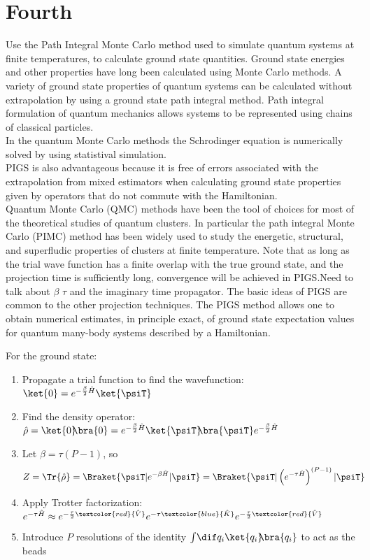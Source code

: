 \section{Fourth}
 Use the Path Integral Monte Carlo method used to simulate quantum systems at finite temperatures, to calculate ground state quantities. Ground state energies and other properties have long been calculated using Monte Carlo methods. A variety of ground state properties of quantum systems can be calculated without extrapolation by using a ground state path integral method. Path integral formulation of quantum mechanics allows systems to be represented using chains of classical particles. \\
In the quantum Monte Carlo methods the Schrodinger equation is numerically solved by using statistival simulation. \\
PIGS is also advantageous because it is free of errors associated with the extrapolation from mixed estimators when calculating ground state properties given by operators that do not commute with the Hamiltonian. \\
Quantum Monte Carlo (QMC) methods have been the tool of choices for most of the theoretical studies of quantum clusters. In particular the path integral Monte Carlo (PIMC) method has been widely used to study the energetic, structural, and superfludic properties of clusters at finite temperature. Note that as long as the trial wave function has a finite overlap with the true ground state, and the projection time is sufficiently long, convergence will be achieved in PIGS.Need to talk about $\beta$ $\tau$ and the imaginary time propagator.
The basic ideas of PIGS are common to the other projection techniques. The PIGS method allows one to obtain numerical estimates, in principle exact, of ground state expectation values for quantum many-body systems described by a Hamiltonian.


For the ground state:
\begin{enumerate}\setlength{\itemindent}{1em}
	\item Propagate a trial function to find the wavefunction: $\ket{0} = e^{-\frac{\beta}{2} \hat{H}} \ket{\psiT}$
	\item Find the density operator: $\hat{\rho} = \ket{0}\!\!\bra{0} = e^{-\frac{\beta}{2} \hat{H}} \ket{\psiT}\!\!\bra{\psiT} e^{-\frac{\beta}{2} \hat{H}}$
	\item Let $\beta = \tau (P-1)$, so
		\begin{align*}
			Z
			&= \Tr{\hat{\rho}}
			= \Braket{\psiT | e^{-\beta \hat{H}} | \psiT}
			= \Braket{\psiT | \left( e^{-\tau \hat{H}} \right)^{(P-1)} | \psiT}
		\end{align*}
	\item Apply Trotter factorization:~\cite{schmidt2014inclusion}
		$
			e^{-\tau \hat{H}}
			\approx
				e^{-\frac{\tau}{2} \textcolor{red}{\hat{V}}}
				e^{-\tau \textcolor{blue}{\hat{K}}}
				e^{-\frac{\tau}{2} \textcolor{red}{\hat{V}}}
		$
	\item Introduce $P$ resolutions of the identity $\int\! \dif q_i \ket{q_i}\!\!\bra{q_i}$ to act as the beads
\end{enumerate}


